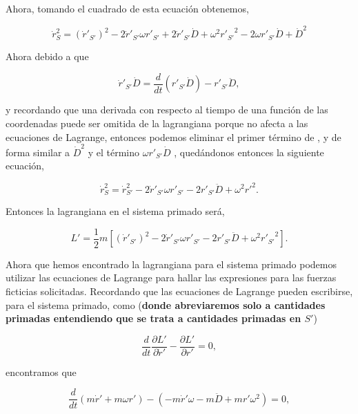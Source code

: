 \documentclass[a4paper,10pt]{article}
\numberwithin{equation}{section}
\begin{document}
Ahora, tomando el cuadrado de esta ecuación obtenemos,

\begin{equation}
 \dot{r}_S^2 = (\dot{r}'_{S'})^2 - 2 \dot{r}'_{S'}\omega r'_{S'} + 2 \dot{r}'_{S'}\dot{D} + 
 \omega^2 {r'_{S'}}^2 - 2 \omega r'_{S'}\dot{D} + \dot{D}^2
\end{equation}

Ahora debido a que 

\begin{equation}
 \dot{r}'_{S'}\dot{D} = \frac{d}{dt}(r'_{S'}\dot{D}) - r'_{S'}\ddot{D},
 \label{eq:lagrangeTeoremita}
\end{equation}

y recordando que una derivada con respecto al tiempo de una función de las coordenadas 
puede ser omitida de la lagrangiana porque no afecta a las ecuaciones de Lagrange, entonces 
podemos eliminar el primer término de , y de forma similar 
a $\dot{D}^2$ y el término $\omega r'_{S'}\dot{D} $ , quedándonos entonces la siguiente ecuación,

\begin{equation}
 \dot{r}_S^2 = \dot{r}_{S'}^2 - 2 \dot{r}'_{S'}\omega r'_{S'} - 2 r'_{S'}\ddot{D}+ 
 \omega^2 r'^2.
\end{equation}

Entonces la lagrangiana en el sistema primado será,

\begin{equation}
 L' = \frac{1}{2}m [(\dot{r}'_{S'})^2 - 2 \dot{r}'_{S'}\omega r'_{S'} - 2 r'_{S'}\ddot{D}+ 
 \omega^2 {r'_{S'}}^2].
\end{equation}

Ahora que hemos encontrado la lagrangiana para el sistema primado podemos utilizar 
las ecuaciones de Lagrange para hallar las expresiones para las fuerzas ficticias 
solicitadas. Recordando que las ecuaciones de Lagrange pueden escribirse, para el 
sistema primado, como (\textbf{donde abreviaremos solo a cantidades primadas entendiendo 
que se trata a cantidades primadas en $S'$})

\begin{equation}
 \frac{d}{dt}\frac{\partial L'}{\partial \dot{r}'} - \frac{\partial L'}{\partial r'} = 0,
\end{equation}

encontramos que 

\begin{equation}
 \frac{d}{dt}(m\dot{r}' + m\omega r') - (- m \dot{r}' \omega - m\ddot{D} + mr'\omega^2) = 0,
\end{equation}
\end{document}
